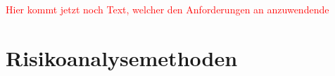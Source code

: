 \textcolor{red}{Hier kommt jetzt noch Text, welcher den Anforderungen an anzuwendende }
  
\section{Risikoanalysemethoden}
